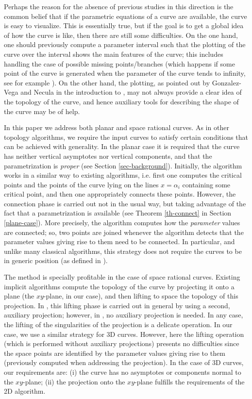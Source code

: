 \documentclass{elsart}
\begin{document}
Perhaps the reason for the absence of previous studies in this
direction is the common belief that if the parametric equations of
a curve are available, the curve is easy to visualize. This is
essentially true, but if the goal is to get a global idea of how
the curve is like, then there are still some difficulties. On the
one hand, one should previously compute a parameter interval such
that the plotting of the curve over the interval shows the main
features of the curve; this includes handling the case of possible
missing points/branches (which happens if some point of the curve
is generated when the parameter of the curve tends to infinity,
see for example \cite{Andradas}). On the other hand, the plotting,
as pointed out by Gonzalez-Vega and Necula in the introduction to
\cite{Lalo}, may not always provide a clear idea of the topology
of the curve, and hence auxiliary tools for describing the shape
of the curve may be of help.

In this paper we address both planar and space rational curves. As in other topology algorithms, we require the
input curves to satisfy certain conditions that can be achieved
with generality. In the planar case it is
required that the curve has neither vertical asymptotes nor
vertical components, and that the parametrization is {\it proper}
(see Section \ref{sec-background}). Initially,
the algorithm works in a similar way to existing
algorithms, i.e. first one computes the critical
points and the points of the curve lying on the lines $x=\alpha_i$
containing some critical point, and then one
appropriately connects these points. However, the connection phase
is carried out not in the usual way, but taking
advantage of the fact that a  parametrization
 is available (see Theorem \ref{th-connect} in
Section \ref{plane-case}). More precisely, the algorithm computes how the {\it parameter} values are
connected; so, two points are joined whenever the
algorithm detects that the parameter values giving rise to them
need to be connected. In particular, and unlike many classical
algorithms, this strategy does not require the curves to be in generic position (as defined in \cite{Lalo}).



The method is specially profitable in the case of space rational
curves. Existing implicit algorithms compute the topology of the
curve by projecting it onto a plane (the $xy$-plane, in our case),
and then lifting to space the topology of this projection. In
\cite{JG-Sendra}, this lifting phase is carried out in general by
using a second, auxiliary projection; however, in \cite{Diat},
\cite{ElKa} no auxiliary projection is needed. In any case, the
lifting of the singularities of the projection is a delicate
operation. In our case, we use a similar strategy for 3D curves.
However, here the lifting operation (which is performed without
auxiliary projections) presents no difficulties since the space
points are identified by the parameter values giving rise to them
(previously computed when addressing the projection). In the case
of 3D curves, our requirements are: (i) the curve has no
asymptotes or components normal to the $xy$-plane; (ii) the
projection onto the $xy$-plane fulfills the requirements of the 2D
algorithm.
\end{document}
